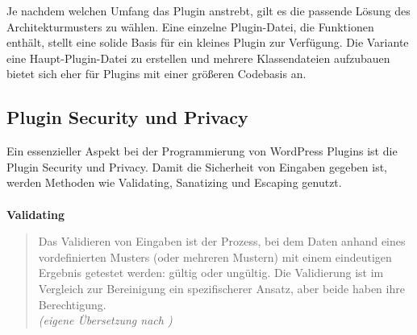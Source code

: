 Je nachdem welchen Umfang das Plugin anstrebt, gilt es die passende Lösung des Architekturmusters zu wählen.
Eine einzelne Plugin-Datei, die Funktionen enthält, stellt eine solide Basis für ein kleines Plugin zur Verfügung.
Die Variante eine Haupt-Plugin-Datei zu erstellen und mehrere Klassendateien aufzubauen bietet sich eher für Plugins mit einer größeren Codebasis an.

\subsection{Plugin Security und Privacy}
Ein essenzieller Aspekt bei der Programmierung von WordPress Plugins ist die Plugin Security und Privacy.
Damit die Sicherheit von Eingaben gegeben ist, werden Methoden wie Validating, Sanatizing und Escaping genutzt.
\\\\
\textbf{Validating}

\begin{quote}
 Das Validieren von Eingaben ist der Prozess, bei dem Daten anhand eines vordefinierten Musters (oder mehreren Mustern) mit einem eindeutigen Ergebnis getestet werden: gültig oder ungültig.
 Die Validierung ist im Vergleich zur Bereinigung ein spezifischerer Ansatz, aber beide haben ihre Berechtigung.
 \\[0.5em]
 \emph{(eigene Übersetzung nach \cite{wordpress2024plugin_validation})}
\end{quote}

